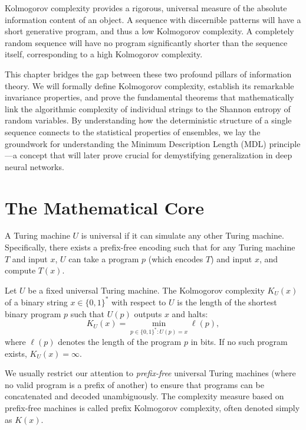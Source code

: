 Kolmogorov complexity provides a rigorous, universal measure of the absolute information content of an object. A sequence with discernible patterns will have a short generative program, and thus a low Kolmogorov complexity. A completely random sequence will have no program significantly shorter than the sequence itself, corresponding to a high Kolmogorov complexity. 

This chapter bridges the gap between these two profound pillars of information theory. We will formally define Kolmogorov complexity, establish its remarkable invariance properties, and prove the fundamental theorems that mathematically link the algorithmic complexity of individual strings to the Shannon entropy of random variables. By understanding how the deterministic structure of a single sequence connects to the statistical properties of ensembles, we lay the groundwork for understanding the Minimum Description Length (MDL) principle---a concept that will later prove crucial for demystifying generalization in deep neural networks.

\section{The Mathematical Core}

\begin{definition}
A Turing machine $U$ is universal if it can simulate any other Turing machine. Specifically, there exists a prefix-free encoding such that for any Turing machine $T$ and input $x$, $U$ can take a program $p$ (which encodes $T$) and input $x$, and compute $T(x)$.
\end{definition}

\begin{definition}
Let $U$ be a fixed universal Turing machine. The Kolmogorov complexity $K_U(x)$ of a binary string $x \in \{0,1\}^*$ with respect to $U$ is the length of the shortest binary program $p$ such that $U(p)$ outputs $x$ and halts:
\[ K_U(x) = \min_{p \in \{0,1\}^* : U(p) = x} \ell(p), \]
where $\ell(p)$ denotes the length of the program $p$ in bits. If no such program exists, $K_U(x) = \infty$.
\end{definition}

We usually restrict our attention to \textit{prefix-free} universal Turing machines (where no valid program is a prefix of another) to ensure that programs can be concatenated and decoded unambiguously. The complexity measure based on prefix-free machines is called prefix Kolmogorov complexity, often denoted simply as $K(x)$.

